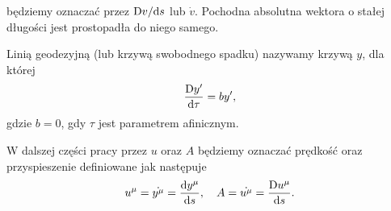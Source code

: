 będziemy oznaczać przez $\text{D} v/\text{d} s$ lub $\dot{v}$. 
Pochodna absolutna wektora o stałej długości 
jest prostopadła do niego samego.
\begin{definition}
Linią geodezyjną (lub krzywą swobodnego spadku) nazywamy 
krzywą $y$, dla której
\begin{align*}
\frac{\text{D} y'}{\text{d} \tau } = b y',
\end{align*} 
gdzie $b=0$, gdy $\tau$ jest parametrem afinicznym.
\end{definition}
W dalszej części pracy przez $u$ oraz $A$ będziemy oznaczać
prędkość oraz przyspieszenie definiowane jak następuje
\begin{align*}
u^\mu = \dot{y^\mu} = \frac{\text{d} y^\mu}{\text{d} s}, 
\quad A = \dot{u^\mu} =  \frac{\text{D} u^\mu}{\text{d} s}.
\end{align*}

